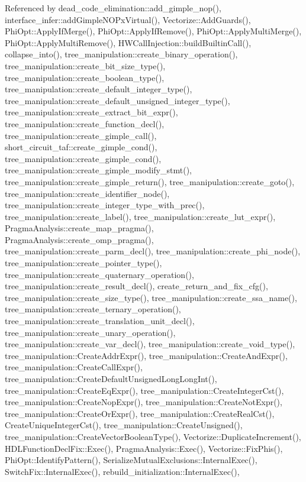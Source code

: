 Referenced by dead\+\_\+code\+\_\+elimination\+::add\+\_\+gimple\+\_\+nop(), interface\+\_\+infer\+::add\+Gimple\+N\+O\+Px\+Virtual(), Vectorize\+::\+Add\+Guards(), Phi\+Opt\+::\+Apply\+If\+Merge(), Phi\+Opt\+::\+Apply\+If\+Remove(), Phi\+Opt\+::\+Apply\+Multi\+Merge(), Phi\+Opt\+::\+Apply\+Multi\+Remove(), H\+W\+Call\+Injection\+::build\+Builtin\+Call(), collapse\+\_\+into(), tree\+\_\+manipulation\+::create\+\_\+binary\+\_\+operation(), tree\+\_\+manipulation\+::create\+\_\+bit\+\_\+size\+\_\+type(), tree\+\_\+manipulation\+::create\+\_\+boolean\+\_\+type(), tree\+\_\+manipulation\+::create\+\_\+default\+\_\+integer\+\_\+type(), tree\+\_\+manipulation\+::create\+\_\+default\+\_\+unsigned\+\_\+integer\+\_\+type(), tree\+\_\+manipulation\+::create\+\_\+extract\+\_\+bit\+\_\+expr(), tree\+\_\+manipulation\+::create\+\_\+function\+\_\+decl(), tree\+\_\+manipulation\+::create\+\_\+gimple\+\_\+call(), short\+\_\+circuit\+\_\+taf\+::create\+\_\+gimple\+\_\+cond(), tree\+\_\+manipulation\+::create\+\_\+gimple\+\_\+cond(), tree\+\_\+manipulation\+::create\+\_\+gimple\+\_\+modify\+\_\+stmt(), tree\+\_\+manipulation\+::create\+\_\+gimple\+\_\+return(), tree\+\_\+manipulation\+::create\+\_\+goto(), tree\+\_\+manipulation\+::create\+\_\+identifier\+\_\+node(), tree\+\_\+manipulation\+::create\+\_\+integer\+\_\+type\+\_\+with\+\_\+prec(), tree\+\_\+manipulation\+::create\+\_\+label(), tree\+\_\+manipulation\+::create\+\_\+lut\+\_\+expr(), Pragma\+Analysis\+::create\+\_\+map\+\_\+pragma(), Pragma\+Analysis\+::create\+\_\+omp\+\_\+pragma(), tree\+\_\+manipulation\+::create\+\_\+parm\+\_\+decl(), tree\+\_\+manipulation\+::create\+\_\+phi\+\_\+node(), tree\+\_\+manipulation\+::create\+\_\+pointer\+\_\+type(), tree\+\_\+manipulation\+::create\+\_\+quaternary\+\_\+operation(), tree\+\_\+manipulation\+::create\+\_\+result\+\_\+decl(), create\+\_\+return\+\_\+and\+\_\+fix\+\_\+cfg(), tree\+\_\+manipulation\+::create\+\_\+size\+\_\+type(), tree\+\_\+manipulation\+::create\+\_\+ssa\+\_\+name(), tree\+\_\+manipulation\+::create\+\_\+ternary\+\_\+operation(), tree\+\_\+manipulation\+::create\+\_\+translation\+\_\+unit\+\_\+decl(), tree\+\_\+manipulation\+::create\+\_\+unary\+\_\+operation(), tree\+\_\+manipulation\+::create\+\_\+var\+\_\+decl(), tree\+\_\+manipulation\+::create\+\_\+void\+\_\+type(), tree\+\_\+manipulation\+::\+Create\+Addr\+Expr(), tree\+\_\+manipulation\+::\+Create\+And\+Expr(), tree\+\_\+manipulation\+::\+Create\+Call\+Expr(), tree\+\_\+manipulation\+::\+Create\+Default\+Unsigned\+Long\+Long\+Int(), tree\+\_\+manipulation\+::\+Create\+Eq\+Expr(), tree\+\_\+manipulation\+::\+Create\+Integer\+Cst(), tree\+\_\+manipulation\+::\+Create\+Nop\+Expr(), tree\+\_\+manipulation\+::\+Create\+Not\+Expr(), tree\+\_\+manipulation\+::\+Create\+Or\+Expr(), tree\+\_\+manipulation\+::\+Create\+Real\+Cst(), Create\+Unique\+Integer\+Cst(), tree\+\_\+manipulation\+::\+Create\+Unsigned(), tree\+\_\+manipulation\+::\+Create\+Vector\+Boolean\+Type(), Vectorize\+::\+Duplicate\+Increment(), H\+D\+L\+Function\+Decl\+Fix\+::\+Exec(), Pragma\+Analysis\+::\+Exec(), Vectorize\+::\+Fix\+Phis(), Phi\+Opt\+::\+Identify\+Pattern(), Serialize\+Mutual\+Exclusions\+::\+Internal\+Exec(), Switch\+Fix\+::\+Internal\+Exec(), rebuild\+\_\+initialization\+::\+Internal\+Exec(), 